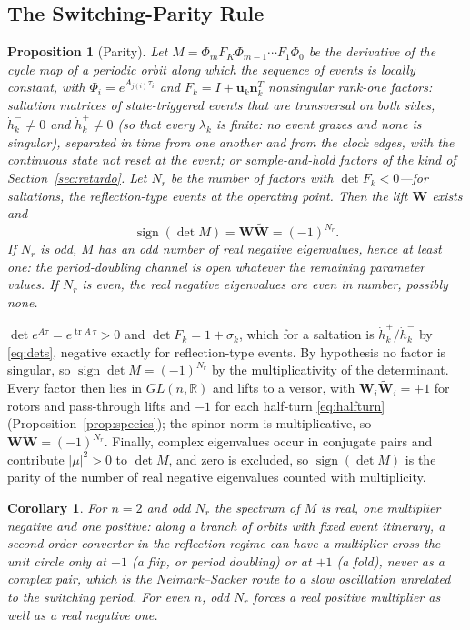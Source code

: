 \documentclass[journal]{IEEEtran}
\newtheorem{proposition}{Proposition}
\newtheorem{corollary}{Corollary}
\newcommand{\rev}[1]{\widetilde{#1}}
\newcommand{\sgn}{\operatorname{sign}}
\begin{document}
\subsection{The Switching-Parity Rule}
\begin{proposition}[Parity]
\label{prop:parity}
Let $M=\Phi_m F_K\Phi_{m-1}\cdots F_1\Phi_0$ be the derivative of the cycle
map of a periodic orbit along which the sequence of events is locally
constant, with $\Phi_i=e^{A_{j(i)}\tau_i}$ and $F_k=I+\bm{u}_k\bm{n}_k^{T}$
nonsingular rank-one factors: saltation matrices of state-triggered events
that are transversal on both sides, $\dot h_k^{-}\neq0$ and
$\dot h_k^{+}\neq0$ (so that every $\lambda_k$ is finite: no event grazes and
none is singular), separated in time from one another and from the clock
edges, with the continuous state not reset at the event; or sample-and-hold
factors of the kind of Section~\ref{sec:retardo}. Let $N_r$ be the number of
factors with $\det F_k<0$---for saltations, the reflection-type events at the
operating point. Then the lift $\bm{W}$ exists and
\begin{equation}
\sgn(\det M)=\bm{W}\rev{\bm{W}}=(-1)^{N_r}.
\label{eq:parity}
\end{equation}
If $N_r$ is odd, $M$ has an odd number of real negative eigenvalues, hence
at least one: the period-doubling channel is open whatever the remaining
parameter values. If $N_r$ is even, the real negative eigenvalues are even
in number, possibly none.
\end{proposition}

\begin{IEEEproof}
$\det e^{A\tau}=e^{\operatorname{tr}A\,\tau}>0$ and $\det F_k=1+\sigma_k$,
which for a saltation is $\dot h_k^{+}/\dot h_k^{-}$ by \eqref{eq:dets},
negative exactly for reflection-type events. By hypothesis no factor is
singular, so $\sgn\det M=(-1)^{N_r}$ by the multiplicativity of the
determinant. Every factor then lies in $GL(n,\mathbb{R})$ and lifts to a
versor, with $\bm{W}_i\rev{\bm{W}}_i=+1$ for rotors and pass-through lifts and
$-1$ for each half-turn \eqref{eq:halfturn} (Proposition~\ref{prop:species});
the spinor norm is multiplicative, so $\bm{W}\rev{\bm{W}}=(-1)^{N_r}$.
Finally, complex eigenvalues occur in conjugate pairs and contribute
$\lvert\mu\rvert^{2}>0$ to $\det M$, and zero is excluded, so $\sgn(\det M)$
is the parity of the number of real negative eigenvalues counted with
multiplicity.
\end{IEEEproof}

\begin{corollary}
\label{cor:n2}
For $n=2$ and odd $N_r$ the spectrum of $M$ is real, one multiplier
negative and one positive: along a branch of orbits with fixed event
itinerary, a second-order converter in the reflection regime can have a
multiplier cross the unit circle only at $-1$ (a flip, or period doubling)
or at $+1$ (a fold), never as a complex pair, which is the Neimark--Sacker
route to a slow oscillation unrelated to the switching period. For even $n$,
odd $N_r$ forces a real positive multiplier as well as a real negative one.
\end{corollary}
\end{document}
